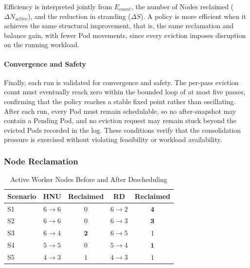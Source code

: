 Efficiency is interpreted jointly from \(E_{count}\), the number of Nodes reclaimed (\(\Delta N_{\text{active}}\)), and the reduction in stranding (\(\Delta S\)). A policy is more efficient when it achieves the same structural improvement, that is, the same reclamation and balance gain, with fewer Pod movements, since every eviction imposes disruption on the running workload.

\paragraph{Convergence and Safety}
\label{subsubsec:defrag_metric_safety}
Finally, each run is validated for convergence and safety. The per-pass eviction count must eventually reach zero within the bounded loop of at most five passes, confirming that the policy reaches a stable fixed point rather than oscillating. After each run, every Pod must remain schedulable, so no after-snapshot may contain a Pending Pod, and no eviction request may remain stuck beyond the evicted Pods recorded in the log. These conditions verify that the consolidation pressure is exercised without violating feasibility or workload availability.

\subsubsection{Node Reclamation}
\label{sec:defrag_node_reclamation}

\begin{table}[tbp]
    \centering
    \caption{Active Worker Nodes Before and After Descheduling}
    \label{tab:defrag_node_reclamation}
    \small
    \renewcommand{\arraystretch}{1.2}
    \begin{tabular}{@{}l c c c c@{}}
        \hline
        \textbf{Scenario} & \textbf{HNU} & \textbf{Reclaimed} & \textbf{RD} & \textbf{Reclaimed} \\
        \hline
        S1 & \(6 \rightarrow 6\) & \(0\) & \(6 \rightarrow 2\) & \(\mathbf{4}\) \\
        S2 & \(6 \rightarrow 6\) & \(0\) & \(6 \rightarrow 3\) & \(\mathbf{3}\) \\
        S3 & \(6 \rightarrow 4\) & \(\mathbf{2}\) & \(6 \rightarrow 5\) & \(1\) \\
        S4 & \(5 \rightarrow 5\) & \(0\) & \(5 \rightarrow 4\) & \(\mathbf{1}\) \\
        S5 & \(4 \rightarrow 3\) & \(1\) & \(4 \rightarrow 3\) & \(1\) \\
        \hline
    \end{tabular}
\end{table}

